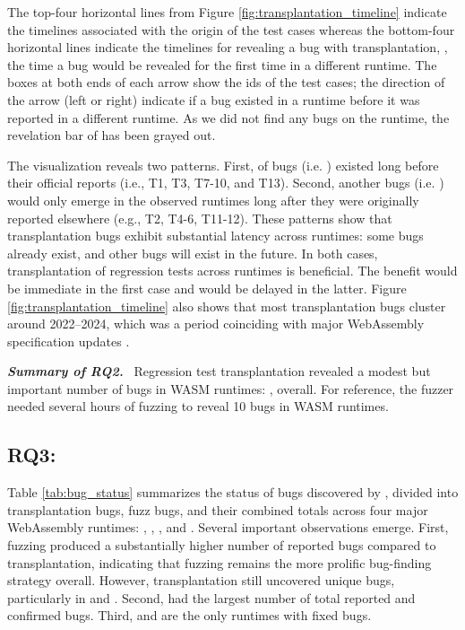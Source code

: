 \documentclass[lettersize,journal]{IEEEtran}
\begin{document}
The top-four horizontal lines from Figure \ref{fig:transplantation_timeline} indicate the timelines associated with the origin of the test cases whereas the bottom-four horizontal lines indicate the timelines for revealing a bug with transplantation, \ie{}, the time a bug would be revealed for the first time in a different runtime. The boxes at both ends of each arrow show the ids of the test cases; the direction of the arrow (left or right) indicate if a bug existed in a runtime before it was reported in a different runtime.
As we did not find any bugs on the \wasmtime{} runtime, the revelation bar of \wasmtime{} has been grayed out. 

The visualization reveals two patterns. 
First, \TransplantationPreExistingCount{} of \TransplantationBugsCount{} bugs (i.e. \TransplantationPreExistingPercentage{}) existed long before their official reports (i.e., T1, T3, T7-10, and T13).
Second, another \TransplantationPostExistingCount{} bugs (i.e. \TransplantationPostExistingPercentage{}) would only emerge in the observed runtimes long after they were originally reported elsewhere (e.g., T2, T4-6, T11-12).
These patterns show that transplantation bugs exhibit substantial latency across runtimes: some bugs already exist, and other bugs will exist in the future. In both cases, transplantation of regression tests across runtimes is beneficial. The benefit would be immediate in the first case and would be delayed in the latter.
Figure \ref{fig:transplantation_timeline} also shows that most transplantation bugs cluster around 2022--2024, which was a period coinciding with major WebAssembly specification updates \cite{changelog1, changelog2}.

\begin{tcolorbox}[rqbox]
\emph{\textbf{Summary of RQ2.}}~
Regression test transplantation revealed a modest but important number of bugs in WASM runtimes: \textbf{\TransplantationBugsCount{}}, overall. For reference, the fuzzer \wapplique{} needed several hours of fuzzing to reveal 10 bugs in WASM runtimes. 
\end{tcolorbox}



\subsection{\textbf{RQ3: \rqthree{}{}}}
\label{sec:rqthree}



Table \ref{tab:bug_status} summarizes the status of bugs discovered by \rtbench{}, divided into transplantation bugs, fuzz bugs, and their combined totals across four major WebAssembly runtimes: \wasmtime{}, \wasmer{}, \wamr{}, and \wasmedge{}. Several important observations emerge. First, fuzzing produced a substantially higher number of reported bugs compared to transplantation, indicating that fuzzing remains the more prolific bug-finding strategy overall. However, transplantation still uncovered unique bugs, particularly in \wamr{} and \wasmedge{}. Second, \wasmer{} had the largest number of total reported and confirmed bugs. Third, \wasmedge{} and \wasmer{} are the only runtimes with fixed bugs.
\end{document}
